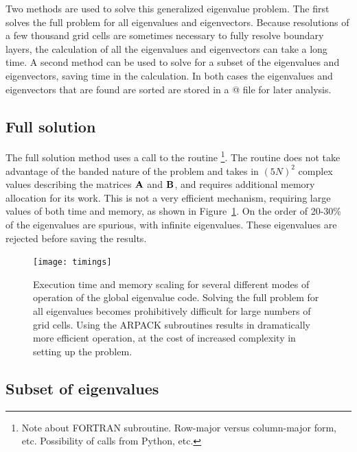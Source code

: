 \documentclass[letterpaper]{article}
\begin{document}
Two methods are used to solve this generalized eigenvalue problem. The
first solves the full problem for all eigenvalues and
eigenvectors. Because resolutions of a few thousand grid cells are
sometimes necessary to fully resolve boundary layers, the calculation
of all the eigenvalues and eigenvectors can take a long time. A second
method can be used to solve for a subset of the eigenvalues and
eigenvectors, saving time in the calculation. In both cases the
eigenvalues and eigenvectors that are found are sorted are stored in a
@ file for later analysis.

\subsection{Full solution}

The full solution method uses a call to the \verb@LAPACK@ routine
\verb@ZGGEV@
\footnote{Note about FORTRAN subroutine. Row-major versus column-major
  form, etc. Possibility of calls from Python, etc.}.  The routine
does not take advantage of the banded nature of the problem and takes
in $(5N)^2$ complex values describing the matrices ${\bf A}$ and ${\bf
  B}$, and requires additional memory allocation for its work. This is
not a very efficient mechanism, requiring large values of both time
and memory, as shown in Figure~\ref{fig:globalcode:timings}. On the
order of 20-30\% of the eigenvalues are spurious, with infinite
eigenvalues. These eigenvalues are rejected before saving the results.

\begin{figure}
\centering
\texttt{[image: timings]}
\caption[Execution time and memory scaling for global eigenvalue
  code]{Execution time and memory scaling for several different modes
  of operation of the global eigenvalue code. Solving the full problem
  for all eigenvalues becomes prohibitively difficult for large
  numbers of grid cells. Using the ARPACK subroutines results in
  dramatically more efficient operation, at the cost of increased
  complexity in setting up the problem.}
\label{fig:globalcode:timings}
\end{figure}

\subsection{Subset of eigenvalues}
\end{document}

